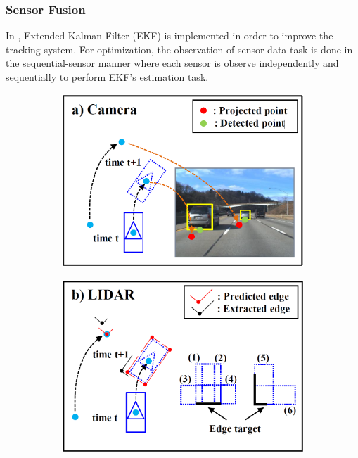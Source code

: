 \subsubsection{Sensor Fusion}
In \cite{Cho_2014}, Extended Kalman Filter (EKF) is implemented in order to improve the tracking system. For optimization, the observation of sensor data task is done in the sequential-sensor manner where each sensor is observe independently and sequentially to perform EKF’s estimation task.
\begin{figure}
    \centering
    \begin{subfigure}[b]{0.3\textwidth}
        \includegraphics[width=\textwidth]{src/pic/obstacle_a.png}
        \caption{}
        \label{fig:obstacle_a}
    \end{subfigure}
    \begin{subfigure}[b]{0.3\textwidth}
        \includegraphics[width=\textwidth]{src/pic/obstacle_b.png}

\end{subfigure}
\end{figure}
